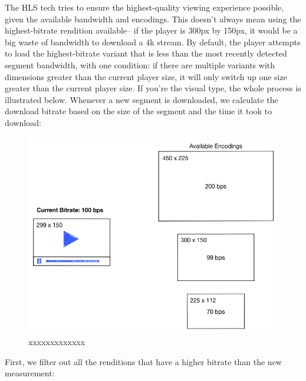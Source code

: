 The HLS tech tries to ensure the highest-quality viewing experience possible, given the available bandwidth and encodings. This doesn't always mean using the highest-bitrate rendition available-- if the player is 300px by 150px, it would be a big waste of bandwidth to download a 4k stream. By default, the player attempts to load the highest-bitrate variant that is less than the most recently detected segment bandwidth, with one condition: if there are multiple variants with dimensions greater than the current player size, it will only switch up one size greater than the current player size.
If you're the visual type, the whole process is illustrated below. Whenever a new segment is downloaded, we calculate the download bitrate based on the size of the segment and the time it took to download:



\begin{figure}[htb] %
 \centering
 \includegraphics[width=1.0\linewidth]{images/chapter3/bitrate-switching-1.png}\hfill
 \caption[xxxxxxxxx]{xxxxxxxxxxxxx}
 \label{fig:fourV}
\end{figure}


First, we filter out all the renditions that have a higher bitrate than the new measurement:



